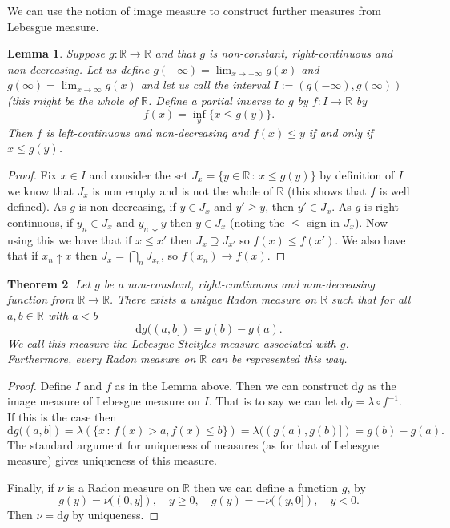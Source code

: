 \documentclass[11pt]{article}
\newtheorem{thm}{Theorem}[section]
\newtheorem{lem}[thm]{Lemma}
\theoremstyle{definition}
\theoremstyle{remark}
\begin{document}
We can use the notion of image measure to construct further measures from Lebesgue measure.
\begin{lem}
Suppose $g: \mathbb{R} \rightarrow \mathbb{R}$ and that $g$ is non-constant, right-continuous and non-decreasing. Let us define $g(-\infty) = \lim_{x \rightarrow -\infty} g(x)$ and $g(\infty) = \lim_{x \rightarrow \infty} g(x)$ and let us call the interval $I:= (g(-\infty),g(\infty))$ (this might be the whole of $\mathbb{R}$. Define a partial inverse to $g$ by $f: I \rightarrow \mathbb{R}$ by
\[ f(x) = \inf_y \{ x \leq g(y)\}. \] Then $f$ is left-continuous and non-decreasing and $f(x) \leq y$ if and only if $x \leq g(y)$. 
\end{lem}
\begin{proof}
Fix $x \in I$ and consider the set $J_x = \{ y \in \mathbb{R}\,:\, x \leq g(y)\}$ by definition of $I$ we know that $J_x$ is non empty and is not the whole of $\mathbb{R}$ (this shows that $f$ is well defined). As $g$ is non-decreasing, if $y \in J_x$ and $y' \geq y$, then $y' \in J_x$. As $g$ is right-continuous, if $y_n \in J_x$ and $y_n \downarrow y$ then $y \in J_x$ (noting the $\leq$ sign in $J_x$). Now using this we have that if $x \leq x'$ then $J_x \supseteq J_{x'}$ so $f(x) \leq f(x')$. We also have that if $x_n \uparrow x$ then $J_x = \bigcap_n J_{x_n}$, so $f(x_n) \rightarrow f(x)$. 
\end{proof}

\begin{thm} Let $g$ be a non-constant, right-continuous and non-decreasing function from $\mathbb{R} \rightarrow \mathbb{R}$. There exists a unique Radon measure on $\mathbb{R}$ such that for all $a,b \in \mathbb{R}$ with $a < b$ 
\[ \mathrm{d}g((a,b]) = g(b) - g(a). \] We call this measure the \emph{Lebesgue Steitjles} measure associated with $g$. Furthermore, every Radon measure on $\mathbb{R}$ can be represented this way.
\end{thm}
\begin{proof}
Define $I$ and $f$ as in the Lemma above. Then we can construct $\mathrm{d}g$ as the image measure of Lebesgue measure on $I$. That is to say we can let $\mathrm{d}g = \lambda \circ f^{-1}$. If this is the case then
\[ \mathrm{d}g ((a,b]) = \lambda \left(\{ x \, :\, f(x) > a, f(x) \leq b \} \right) = \lambda ((g(a), g(b)]) = g(b) - g(a). \] The standard argument for uniqueness of measures (as for that of Lebesgue measure) gives uniqueness of this measure. 

Finally, if $\nu$ is a Radon measure on $\mathbb{R}$ then we can define a function $g$, by 
\[ g(y) = \nu((0,y]), \quad y \geq 0, \quad g(y) = -\nu((y,0]), \quad y<0. \] Then $\nu = \mathrm{d}g$ by uniqueness.
\end{proof}
\end{document}
